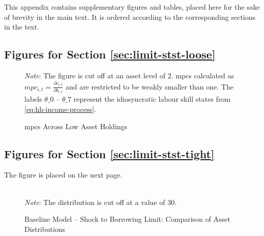 \documentclass[a4paper,12pt]{article} %
\numberwithin{equation}{section} %
\numberwithin{figure}{section}
\numberwithin{table}{section}
\begin{document}
\begin{refsection}
\begin{appendices}
This appendix contains supplementary figures and tables, placed here for the sake of brevity in the main text. It is ordered according to the corresponding sections in the text.

\subsection{Figures for Section \ref{sec:limit-stst-loose}}
\label{sec-app:figures-limit-loose}

\begin{figure}[H]
    \centering
    \caption{\Gls{mpc}s Across Low Asset Holdings}
    \label{fig:baseline-limit-initial-mpcs}
    

    \vspace{10pt}
    
    \begin{minipage}{0.75\textwidth}
    \footnotesize
    \textit{Note}: The figure is cut off at an asset level of $2$. \Gls{mpc}s calculated as $mpc_{i,t} = \frac{\partial c_{i,t}}{\partial b_{i,t}}$ and are restricted to be weakly smaller than one. The labels $\theta\_0$ -- $\theta\_7$ represent the idiosyncratic labour skill states from \eqref{eq:hh-income-process}.
    \end{minipage}
\end{figure}

\subsection{Figures for Section \ref{sec:limit-stst-tight}}
\label{sec-app:figures-limit-tight}

The figure is placed on the next page.

\begin{sidewaysfigure}
    \caption{Baseline Model -- Shock to Borrowing Limit: Comparison of Asset Distributions}
    \label{fig:comparison-stst-baseline-dist}
    \centering

    \\
     \centering
	\textit{Note}: The distribution is cut off at a value of $30$.
\end{sidewaysfigure}


\end{appendices}
\end{refsection}
\end{document}
